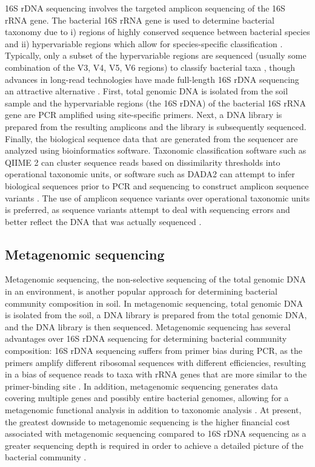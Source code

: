 16S rDNA sequencing involves the targeted amplicon sequencing of the 16S rRNA gene.
The bacterial 16S rRNA gene is used to determine bacterial taxonomy due to i) regions of highly conserved sequence between bacterial species and ii) hypervariable regions which allow for species-specific classification \parencite{vanPham.2012}.
Typically, only a subset of the hypervariable regions are sequenced (usually some combination of the V3, V4, V5, V6 regions) to classify bacterial taxa \parencite{Yang.2016}, though advances in long-read technologies have made full-length 16S rDNA sequencing an attractive alternative \parencite{Shin.2016, Numberger.2019}.
First, total genomic DNA is isolated from the soil sample and the hypervariable regions (the 16S rDNA) of the bacterial 16S rRNA gene are PCR amplified using site-specific primers.
Next, a DNA library is prepared from the resulting amplicons and the library is subsequently sequenced.
Finally, the biological sequence data that are generated from the sequencer are analyzed using bioinformatics software.
Taxonomic classification software such as QIIME 2 can cluster sequence reads based on dissimilarity thresholds into operational taxonomic units, or software such as DADA2 can attempt to infer biological sequences prior to PCR and sequencing to construct amplicon sequence variants \parencite{Bolyen.2019, Callahan.2016}.
The use of amplicon sequence variants over operational taxonomic units is preferred, as sequence variants attempt to deal with sequencing errors and better reflect the DNA that was actually sequenced \parencite{Callahan.2017}.

\subsection{Metagenomic sequencing}

Metagenomic sequencing, the non-selective sequencing of the total genomic DNA in an environment, is another popular approach for determining bacterial community composition in soil.
In metagenomic sequencing, total genomic DNA is isolated from the soil, a DNA library is prepared from the total genomic DNA, and the DNA library is then sequenced.
Metagenomic sequencing has several advantages over 16S rDNA sequencing for determining bacterial community composition:
16S rDNA sequencing suffers from primer bias during PCR, as the primers amplify different ribosomal sequences with different efficiencies, resulting in a bias of sequence reads to taxa with rRNA genes that are more similar to the primer-binding site \parencite{Tremblay.2015}.
In addition, metagenomic sequencing generates data covering multiple genes and possibly entire bacterial genomes, allowing for a metagenomic functional analysis in addition to taxonomic analysis \parencite{Li.2015c}.
At present, the greatest downside to metagenomic sequencing is the higher financial cost associated with metagenomic sequencing compared to 16S rDNA sequencing as a greater sequencing depth is required in order to achieve a detailed picture of the bacterial community \parencite{Scholz.2012}.

